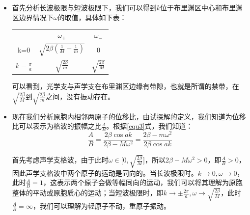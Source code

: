 \documentclass{ctexart}
\begin{document}
                \begin{itemize}
                    \item 首先分析长波极限与短波极限下，我们可以得到$k$位于布里渊区中心和布里渊区边界情况下$\omega$的取值，具体如下表：
                \begin{center}
                    \begin{tabular}{c|c c}
                    \hline
                    \quad & $\omega_+$ & $\omega_-$\\
                    k=0 & $\sqrt{2\beta(\frac{1}{M}+\frac{1}{m})}$ & 0\\
                    $k=\frac{\pi}{a}$ & $\sqrt{\frac{2\beta}{m}}$ & $\sqrt{\frac{2\beta}{M}}$\\
                    \hline
                \end{tabular}
                \end{center}
                
                可以看到，光学支与声学支在布里渊区边缘有带隙，也就是所谓的禁带，在$\sqrt{\frac{2\beta}{M}}$到$\sqrt{\frac{2\beta}{m}}$之间，没有振动存在。
                \item 现在我们分析原胞内相邻两原子的位移比，由试探解的定义，我们知道为位移比可以表示为格波的振幅之比$\frac{A}{B}$。根据\eqref{equ3}式，我们知道：
                \begin{equation}\label{equ4}
                    \frac{A}{B}=\frac{2\beta\cos{ak}}{2\beta-M\omega^2}=\frac{2\beta-m\omega^2}{2\beta\cos{ak}}
                \end{equation}
                
                首先考虑声学支格波，由于此时$\omega\in\Big[0,\sqrt{\frac{2\beta}{M}}\Big]$，所以$2\beta-M\omega^2>0$，即$\frac{A}{B}>0$，因此声学支格波中两个原子的运动是同向的。当长波极限时。$k\rightarrow 0,\omega\rightarrow 0$，此时$\frac{A}{B}=1$，这表示两个原子会做等幅同向的运动，我们可以将其理解为原胞整体的平动或原胞质心的运动；当短波极限时，即$k\rightarrow\pm\frac{2\pi}{a},\omega\rightarrow \sqrt{\frac{2\beta}{M}}$，此时$\frac{A}{B}=\infty$，我们可以理解为轻原子不动，重原子振动。
                

\end{itemize}
\end{document}
